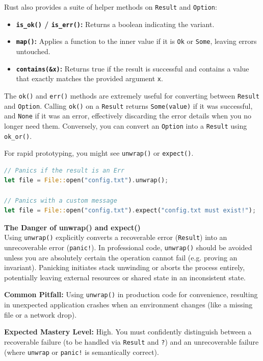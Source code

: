 Rust also provides a suite of helper methods on \texttt{Result} and \texttt{Option}:
\begin{itemize}
    \item \textbf{\texttt{is\_ok()} / \texttt{is\_err()}:} Returns a boolean indicating the variant.
    \item \textbf{\texttt{map()}:} Applies a function to the inner value if it is \texttt{Ok} or \texttt{Some}, leaving errors untouched.
    \item \textbf{\texttt{contains(\&x)}:} Returns true if the result is successful and contains a value that exactly matches the provided argument \texttt{x}.
\end{itemize}

\begin{notebox}
The \texttt{ok()} and \texttt{err()} methods are extremely useful for converting between \texttt{Result} and \texttt{Option}. Calling \texttt{ok()} on a \texttt{Result} returns \texttt{Some(value)} if it was successful, and \texttt{None} if it was an error, effectively discarding the error details when you no longer need them. Conversely, you can convert an \texttt{Option} into a \texttt{Result} using \texttt{ok\_or()}.
\end{notebox}

For rapid prototyping, you might see \texttt{unwrap()} or \texttt{expect()}.
\begin{lstlisting}[language=Rust]
// Panics if the result is an Err
let file = File::open("config.txt").unwrap(); 

// Panics with a custom message
let file = File::open("config.txt").expect("config.txt must exist!");
\end{lstlisting}

\begin{examprioritybox}
\textbf{The Danger of unwrap() and expect()}\\
Using \texttt{unwrap()} explicitly converts a recoverable error (\texttt{Result}) into an unrecoverable error (\texttt{panic!}). In professional code, \texttt{unwrap()} should be avoided unless you are absolutely certain the operation cannot fail (e.g. proving an invariant). Panicking initiates stack unwinding or aborts the process entirely, potentially leaving external resources or shared state in an inconsistent state.

\textbf{Common Pitfall:} Using \texttt{unwrap()} in production code for convenience, resulting in unexpected application crashes when an environment changes (like a missing file or a network drop).

\textbf{Expected Mastery Level:} High. You must confidently distinguish between a recoverable failure (to be handled via \texttt{Result} and \texttt{?}) and an unrecoverable failure (where \texttt{unwrap} or \texttt{panic!} is semantically correct).
\end{examprioritybox}

